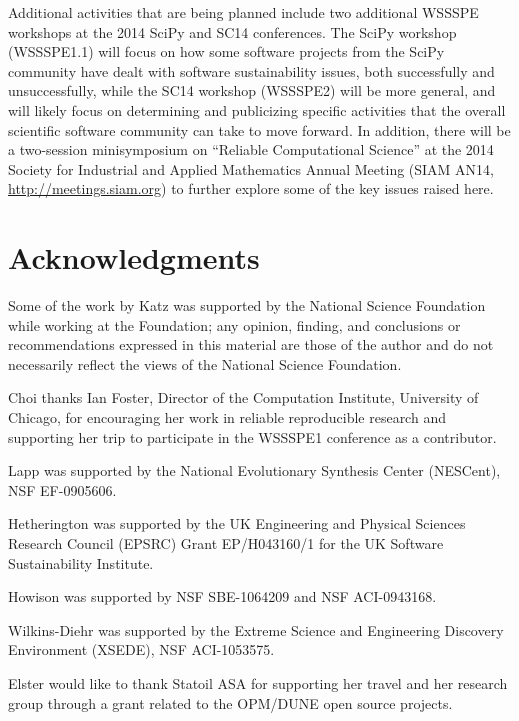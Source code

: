 \documentclass[11pt, oneside]{amsart}
\newcommand{\todo}[1]{{\color{blue}$\blacksquare$~\textsf{[TODO: #1]}}}
\begin{document}
Additional activities that are being planned include two additional
WSSSPE workshops at the 2014 SciPy and SC14 conferences.  The SciPy
workshop (WSSSPE1.1) will focus on how some software projects from the
SciPy community have dealt with software sustainability issues, both
successfully and unsuccessfully, while the SC14 workshop (WSSSPE2)
will be more general, and will likely focus on determining and
publicizing specific activities that the overall scientific software
community can take to move forward.  In addition, there will be a
two-session minisymposium on ``Reliable Computational Science'' at the 2014
Society for Industrial and Applied Mathematics Annual Meeting (SIAM
AN14, \url{http://meetings.siam.org}) to further explore some of the
key issues raised here.




\section*{Acknowledgments}


Some of the work by Katz was supported by the National Science
Foundation while working at the Foundation; any opinion, finding, and
conclusions or recommendations expressed in this material are those of
the author and do not necessarily reflect the views of the National
Science Foundation.

Choi thanks Ian Foster, Director of the Computation Institute,
University of Chicago, for encouraging her work in reliable
reproducible research and supporting her trip to participate in the
WSSSPE1 conference as a contributor.

Lapp was supported by the National Evolutionary Synthesis Center
(NESCent), NSF EF-0905606.

Hetherington was supported by the UK Engineering and Physical Sciences
Research Council (EPSRC) Grant EP/H043160/1 for the UK Software
Sustainability Institute.

Howison was supported by NSF SBE-1064209 and NSF ACI-0943168.

Wilkins-Diehr was supported by the Extreme Science and Engineering Discovery Environment (XSEDE), 
NSF ACI-1053575.

Elster would like to thank Statoil ASA for supporting her travel
and her research group through a grant related to the OPM/DUNE open source projects.
\end{document}
